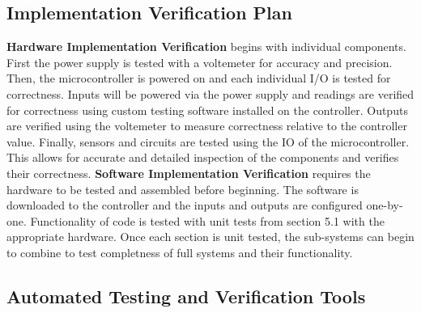 \documentclass[12pt, titlepage]{article}
\begin{document}
\subsection{Implementation Verification Plan}
\textbf{Hardware Implementation Verification} begins with individual components. First 
the power supply is tested with a voltemeter for accuracy and precision. Then, 
the microcontroller is powered on and each individual I/O is tested for correctness. 
Inputs will be powered via the power supply and readings are verified for correctness 
using custom testing software installed on the controller. Outputs are verified using 
the voltemeter to measure correctness relative to the controller value. Finally, 
sensors and circuits are tested using the IO of the microcontroller. This allows
for accurate and detailed inspection of the components and verifies their correctness. 
\newline 
\newline 
\textbf{Software Implementation Verification} requires the hardware to be tested and 
assembled before beginning. The software is downloaded to the controller and the inputs 
and outputs are configured one-by-one. Functionality of code is tested with unit tests
from section 5.1 with the appropriate hardware. Once each section is unit tested, the
sub-systems can begin to combine to test completness of full systems and their functionality.


\subsection{Automated Testing and Verification Tools}

\end{document}
